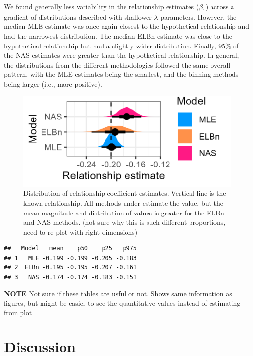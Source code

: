 \documentclass[
]{article}
\begin{document}
We found generally less variability in the relationship estimates
(\(\beta_1\)) across a gradient of distributions described with
shallower \(\lambda\) parameters. However, the median MLE estimate was
once again closest to the hypothetical relationship and had the
narrowest distribution. The median ELBn estimate was close to the
hypothetical relationship but had a slightly wider distribution.
Finally, 95\% of the NAS estimates were greater than the hypothetical
relationship. In general, the distributions from the different
methodologies followed the same overall pattern, with the MLE estimates
being the smallest, and the binning methods being larger (i.e., more
positive).

\begin{figure}
\centering
\includegraphics{figures/PLB_shallow_lambda_relationship_density.png}
\caption{Distribution of relationship coefficient estimates. Vertical
line is the known relationship. All methods under estimate the value,
but the mean magnitude and distribution of values is greater for the
ELBn and NAS methods. (not sure why this is such different proportions,
need to re plot with right dimensions)}
\end{figure}

\begin{verbatim}
##   Model   mean    p50    p25   p975
## 1   MLE -0.199 -0.199 -0.205 -0.183
## 2  ELBn -0.195 -0.195 -0.207 -0.161
## 3   NAS -0.174 -0.174 -0.183 -0.151
\end{verbatim}

\textbf{NOTE} Not sure if these tables are usful or not. Shows same
information as figures, but might be easier to see the quantitative
values instead of estimating from plot

\newpage

\hypertarget{discussion}{%
\section{Discussion}\label{discussion}}
\end{document}
